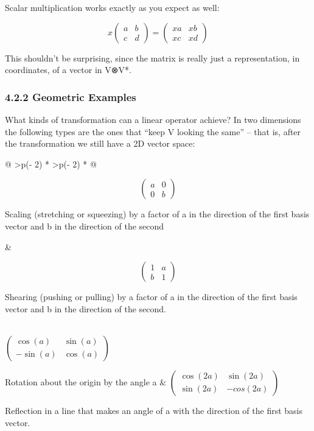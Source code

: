 \documentclass[oneside,english]{amsbook}
\numberwithin{section}{chapter}
\theoremstyle{plain}
\theoremstyle{definition}
\begin{document}
Scalar multiplication works exactly as you expect as well:

\[x\begin{pmatrix}
	a & b \\
	c & d
\end{pmatrix} = \begin{pmatrix}
	xa & xb \\
	xc & xd
\end{pmatrix}\]

This shouldn't be surprising, since the matrix is really just a
representation, in coordinates, of a vector in V⊗V*.

\subsubsection{4.2.2 Geometric Examples}\label{geometric-examples}

What kinds of transformation can a linear operator achieve? In two
dimensions the following types are the ones that ``keep V looking the
same'' -- that is, after the transformation we still have a 2D vector
space:

\begin{longtable}[]{@{}
		>{\centering\arraybackslash}p{}
		>{\centering\arraybackslash}p{}@{}}
	\toprule\noalign{}
	\begin{minipage}[b]{\linewidth}\centering
		\[\begin{pmatrix}
			a & 0 \\
			0 & b
		\end{pmatrix}\]
		
		Scaling (stretching or squeezing) by a factor of a in the direction of
		the first basis vector and b in the direction of the second
	\end{minipage} & \begin{minipage}[b]{\linewidth}\centering
		\[\begin{pmatrix}
			1 & a \\
			b & 1
		\end{pmatrix}\]
		
		Shearing (pushing or pulling) by a factor of a in the direction of the
		first basis vector and b in the direction of the second.
	\end{minipage} \\
	\midrule\noalign{}
	\endhead
	\bottomrule\noalign{}
	\endlastfoot
	\(\begin{pmatrix}
		\cos{(a)} & \sin{(a)} \\
		- \sin{(a)} & \cos{(a)}
	\end{pmatrix}\)
	
	Rotation about the origin by the angle a & \(\begin{pmatrix}
		\cos{(2a)} & \sin{(2a)} \\
		\sin{(2a)} & {- cos}{(2a)}
	\end{pmatrix}\)
	
	Reflection in a line that makes an angle of a with the direction of the
	first basis vector. \\
\end{longtable}
\end{document}
